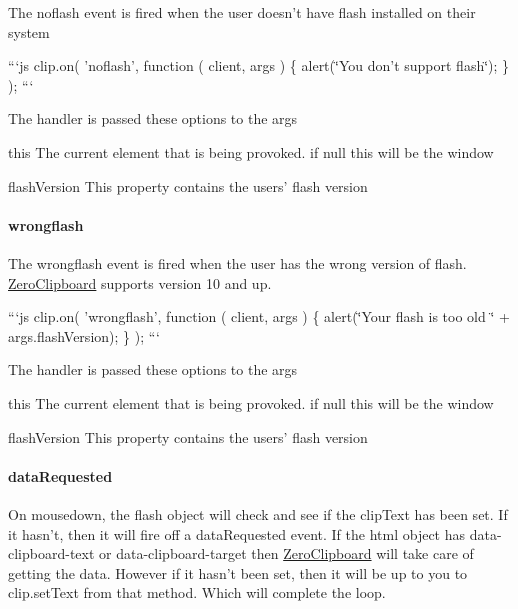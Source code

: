 The {\ttfamily noflash} event is fired when the user doesn't have flash installed on their system

```js clip.\-on( 'noflash', function ( client, args ) \{ alert(\char`\"{}\-You don't support flash\char`\"{}); \} ); ```

The handler is passed these options to the {\ttfamily args}


\begin{DoxyDescription}
\item[this ]The current element that is being provoked. if null this will be the window 
\item[flash\-Version ]This property contains the users' flash version 
\end{DoxyDescription}

\paragraph*{wrongflash}

The {\ttfamily wrongflash} event is fired when the user has the wrong version of flash. \hyperlink{class_zero_clipboard}{Zero\-Clipboard} supports version 10 and up.

```js clip.\-on( 'wrongflash', function ( client, args ) \{ alert(\char`\"{}\-Your flash is too old \char`\"{} + args.\-flash\-Version); \} ); ```

The handler is passed these options to the {\ttfamily args}


\begin{DoxyDescription}
\item[this ]The current element that is being provoked. if null this will be the window 
\item[flash\-Version ]This property contains the users' flash version 
\end{DoxyDescription}

\paragraph*{data\-Requested}

On mousedown, the flash object will check and see if the {\ttfamily clip\-Text} has been set. If it hasn't, then it will fire off a {\ttfamily data\-Requested} event. If the html object has {\ttfamily data-\/clipboard-\/text} or {\ttfamily data-\/clipboard-\/target} then \hyperlink{class_zero_clipboard}{Zero\-Clipboard} will take care of getting the data. However if it hasn't been set, then it will be up to you to {\ttfamily clip.\-set\-Text} from that method. Which will complete the loop.

